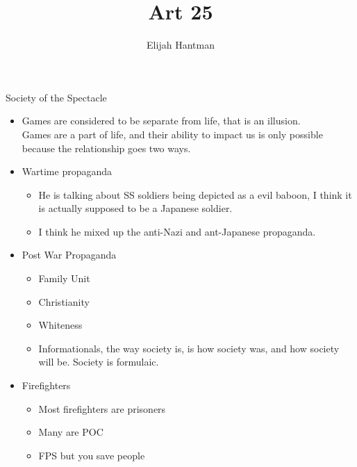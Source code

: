 \documentclass{report}
\title{\Huge{Art 25}}
\author{\huge{Elijah Hantman}}
\date{}
\begin{document}
\maketitle
\newpage

\begin{description}
    \item {\large Society of the Spectacle}  
        \begin{mdframed}
            \begin{itemize}
                \item Games are considered to be separate from
                    life, that is an illusion.\\
                    Games are a part of life, and their ability
                    to impact us is only possible because
                    the relationship goes two ways.
                \item Wartime propaganda
                    \begin{itemize}
                        \item He is talking about SS soldiers
                            being depicted as a evil baboon,
                            I think it is actually supposed to
                            be a Japanese soldier.
                        \item I think he mixed up the anti-Nazi
                            and ant-Japanese propaganda.
                    \end{itemize}
                \item Post War Propaganda
                    \begin{itemize}
                        \item Family Unit
                        \item Christianity
                        \item Whiteness
                        \item Informationals, the way society is,
                            is how society was, and how society
                            will be. Society is formulaic.
                    \end{itemize}
                \item Firefighters
                    \begin{itemize}
                        \item Most firefighters are prisoners
                        \item Many are POC
                        \item FPS but you save people

\end{itemize}
\end{itemize}
\end{mdframed}
\end{description}
\end{document}
